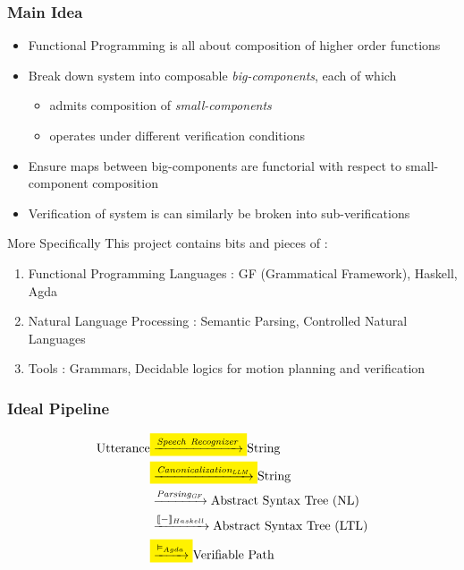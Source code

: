 \documentclass{beamer}
\newcommand{\mathcolorbox}[2]{\colorbox{#1}{$\displaystyle #2$}}
\begin{document}
\begin{frame}
\frametitle{Main Idea}

\begin{itemize}[<+->]
\item Functional Programming is all about composition of higher order functions
\item Break down system into composable \emph{big-components}, each of which
\begin{itemize}[<+->]
\item admits composition of \emph{small-components}
\item operates under different verification conditions
\end{itemize}
\item Ensure maps between big-components are functorial with respect to
  small-component composition
\item Verification of system is can similarly be broken into sub-verifications
\end{itemize}
\end{frame}


\begin{frame}
\begin{exampleblock}{More Specifically}
This project contains bits and pieces of :
\end{exampleblock}
\begin{enumerate}
\item Functional Programming Languages : GF (Grammatical Framework), Haskell, Agda
\item Natural Language Processing : Semantic Parsing, Controlled Natural Languages
\item Tools : Grammars, Decidable logics for motion planning and verification
\end{enumerate}
\end{frame}


\begin{frame}
\frametitle{Ideal Pipeline}

\begin{equation} %
\begin{split}
\text{Utterance} & \mathcolorbox{yellow}{\xrightarrow{\mathit{Speech\ Recognizer}}} \text{String}\\
 & \mathcolorbox{yellow}{\xrightarrow{\mathit{Canonicalization_{LLM}}}} \text{String}\\
 & \xrightarrow{\mathit{Parsing_{GF}}} \text{Abstract Syntax Tree (NL)}\\
 & \xrightarrow{\llbracket - \rrbracket_{Haskell}} \text{Abstract Syntax Tree (LTL)}\\
 & \mathcolorbox{yellow}{\xrightarrow{\vDash_{Agda}}} \text{Verifiable Path}
\end{split}
\end{equation} 
\end{frame}
\end{document}
